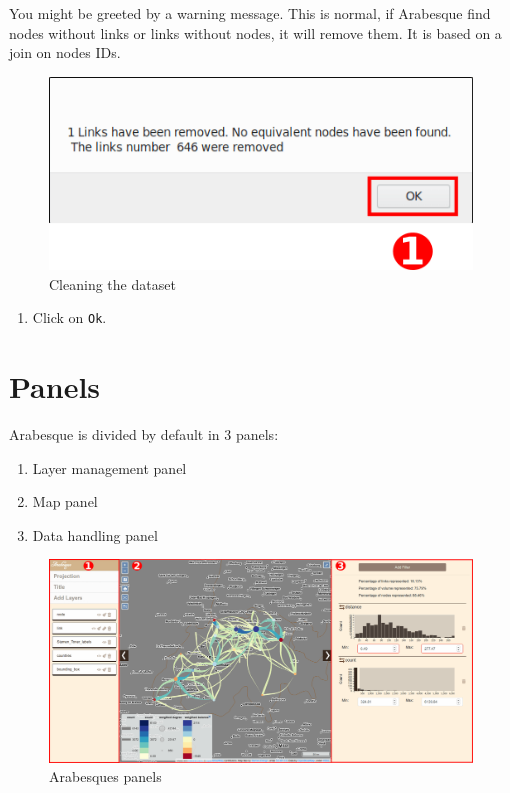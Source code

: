 \documentclass[]{book}
\providecommand{\tightlist}{%
  \setlength{\itemsep}{0pt}\setlength{\parskip}{0pt}}
\begin{document}
You might be greeted by a warning message. This is normal, if Arabesque find nodes
without links or links without nodes, it will remove them. It is based on a
join on nodes IDs.

\begin{figure}
\centering
\includegraphics{images/functions/02_functions_swiss_example_warning.png}
\caption{Cleaning the dataset}
\end{figure}

\begin{enumerate}
\def\labelenumi{\arabic{enumi}.}
\tightlist
\item
  Click on \texttt{Ok}.
\end{enumerate}

\hypertarget{panels}{%
\section{Panels}\label{panels}}

Arabesque is divided by default in 3 panels:

\begin{enumerate}
\def\labelenumi{\arabic{enumi}.}
\tightlist
\item
  Layer management panel
\item
  Map panel
\item
  Data handling panel
\end{enumerate}

\begin{figure}
\centering
\includegraphics{images/functions/03_functions_swiss_example_main_window.png}
\caption{Arabesques panels}
\end{figure}
\end{document}
